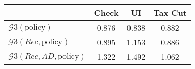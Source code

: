 \begin{tabular}{@{}lccc@{}}
\toprule
                          & Check      & UI    & Tax Cut    \\  \midrule
$\mathcal{G}3(\text{policy})$ & 0.876  & 0.838  & 0.882     \\
$\mathcal{G}3(Rec,\text{policy})$ & 0.895  & 1.153  & 0.886     \\
$\mathcal{G}3(Rec, AD,\text{policy})$ & 1.322  & 1.492  & 1.062     \\
\end{tabular}
